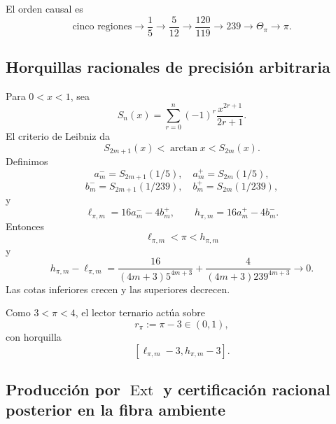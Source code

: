 El orden causal es
\[
 \text{cinco regiones}
 \to\frac15
 \to\frac5{12}
 \to\frac{120}{119}
 \to239
 \to\Theta_\pi
 \to\pi.
\]

\subsection{Horquillas racionales de precisión arbitraria}

Para \(0<x<1\), sea
\[
 S_n(x)=\sum_{r=0}^{n}(-1)^r\frac{x^{2r+1}}{2r+1}.
\]
El criterio de Leibniz da
\[
 S_{2m+1}(x)<\arctan x<S_{2m}(x).
\]
Definimos
\[
 a_m^-=S_{2m+1}(1/5),\quad a_m^+=S_{2m}(1/5),
\]
\[
 b_m^-=S_{2m+1}(1/239),\quad b_m^+=S_{2m}(1/239),
\]
y
\begin{equation}
 \ell_{\pi,m}=16a_m^- -4b_m^+,
 \qquad
 h_{\pi,m}=16a_m^+ -4b_m^-.
 \label{p12-83-c8-s1:eq:horquilla-pi-autonoma}
\end{equation}
Entonces
\[
 \ell_{\pi,m}<\pi<h_{\pi,m}
\]
y
\begin{equation}
 h_{\pi,m}-\ell_{\pi,m}
 =
 \frac{16}{(4m+3)5^{4m+3}}
 +\frac{4}{(4m+3)239^{4m+3}}
 \longrightarrow0.
 \label{p12-83-c8-s1:eq:anchura-horquilla-pi}
\end{equation}
Las cotas inferiores crecen y las superiores decrecen.

Como \(3<\pi<4\), el lector ternario actúa sobre
\[
 r_\pi:=\pi-3\in(0,1),
\]
con horquilla
\[
 [\ell_{\pi,m}-3,h_{\pi,m}-3].
\]

\subsection{Producción por \texorpdfstring{$\operatorname{Ext}$}{Ext} y certificación racional posterior en la fibra ambiente}

